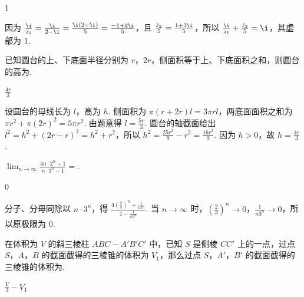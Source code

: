 \begin{answer}
\(1\)
\end{answer}

\begin{solution}
因为 \(\frac{\i}{z_1}=\frac{\i}{2-\i}=\frac{\i(2+\i)}{5}=\frac{-1+2\i}{5}\)，且 \(\frac{\bar z_2}{5}=\frac{1+3\i}{5}\)，所以 \(\frac{\i}{z_1}+\frac{\bar z_2}{5}=\i\)，其虚部为 \(1\).
\end{solution}

\begin{problem}
已知圆台的上、下底面半径分别为 \(r\)，\(2r\)，侧面积等于上、下底面积之和，则圆台的高为\fillinblank{}.
\end{problem}

\begin{answer}
\(\frac{4r}{3}\)
\end{answer}

\begin{solution}
设圆台的母线长为 \(l\)，高为 \(h\). 侧面积为 \(\pi(r+2r)l=3\pi rl\)，两底面面积之和为 \(\pi r^2+\pi(2r)^2=5\pi r^2\). 由题意得 \(l=\frac{5r}{3}\). 圆台的轴截面给出 \(l^2=h^2+(2r-r)^2=h^2+r^2\)，所以 \(h^2=\frac{25r^2}{9}-r^2=\frac{16r^2}{9}\). 因为 \(h>0\)，故 \(h=\frac{4r}{3}\).
\end{solution}

\begin{problem}
\(\displaystyle\lim_{n\to\infty}\frac{4n\cdot 2^n+1}{n\cdot 3^n-1}=\)\fillinblank{}.
\end{problem}

\begin{answer}
\(0\)
\end{answer}

\begin{solution}
分子、分母同除以 \(n\cdot3^n\)，得 \(\frac{4\left(\frac{2}{3}\right)^n+\frac{1}{n3^n}}{1-\frac{1}{n3^n}}\). 当 \(n\to\infty\) 时，\(\left(\frac{2}{3}\right)^n\to0\)，\(\frac{1}{n3^n}\to0\)，所以原极限为 \(0\).
\end{solution}

\begin{problem}
在体积为 \(V\) 的斜三棱柱 \(ABC-A'B'C'\) 中，已知 \(S\) 是侧棱 \(CC'\) 上的一点，过点 \(S\)，\(A\)，\(B\) 的截面截得的三棱锥的体积为 \(V_1\)，那么过点 \(S\)，\(A'\)，\(B'\) 的截面截得的三棱锥的体积为\fillinblank{}.
\end{problem}

\begin{answer}
\(\frac{V}{3}-V_1\)
\end{answer}

